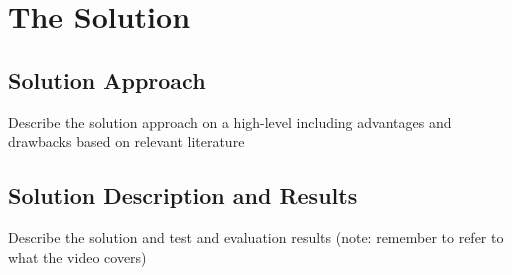 \section{The Solution}

\subsection{Solution Approach}
Describe the solution approach on a high-level including advantages and drawbacks based on relevant literature 

\subsection{Solution Description and Results} 
Describe the solution and test and evaluation results (note: remember to refer to what the video covers)